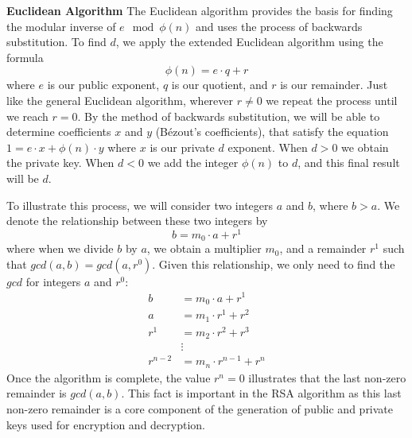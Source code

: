 \documentclass{article}
\begin{document}
\textbf{Euclidean Algorithm}
The Euclidean algorithm provides the basis for finding the modular inverse of $e \mod \phi(n)$ and uses the process of backwards substitution. To find $d$, we apply the extended Euclidean algorithm using the formula
\begin{equation}
\phi(n) = e\cdot q + r
\end{equation}
where $e$ is our public exponent, $q$ is our quotient, and $r$ is our remainder. Just like the general Euclidean algorithm, wherever $r \neq 0$ we repeat the process until we reach $r = 0$. By the method of backwards substitution, we will be able to determine coefficients $x$ and $y$ (Bézout's coefficients), that satisfy the equation $1 = e \cdot x + \phi(n) \cdot y$ where $x$ is our private $d$ exponent. When $d > 0$ we obtain the private key. When $d < 0$ we add the integer $\phi(n)$ to $d$, and this final result will be $d$.

To illustrate this process, we will consider two integers $a$ and $b$, where $b > a$. We denote the relationship between these two integers by
\begin{equation}
b = m_0 \cdot a + r^1
\end{equation}
where when we divide $b$ by $a$, we obtain a multiplier $m_0$, and a remainder $r^1$ such that $gcd(a, b) = gcd(a, r^0)$. Given this relationship, we only need to find the $gcd$ for integers $a$ and $r^0$:
\begin{equation}
\begin{aligned}
b & = m_0 \cdot a + r^1 \\
a & = m_1 \cdot r^1 + r^2 \\
r^1 & = m_2 \cdot r^2 + r^3 \\
&\vdots \\
r^{n-2} & = m_n \cdot  r^{n-1} + r^n
\end{aligned}
\end{equation}
Once the algorithm is complete, the value $r^n = 0$ illustrates that the last non-zero remainder is $gcd(a, b)$. This fact is important in the RSA algorithm as this last non-zero remainder is a core component of the generation of public and private keys used for encryption and decryption.
\end{document}
